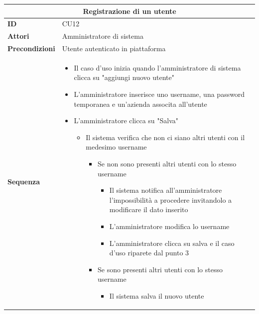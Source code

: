 \documentclass[a4paper,11pt]{article}
\begin{document}
\begin{table}[H]
  \centering
  \begin{tabular}{|m{2cm}|m{10.5cm}|}
    \hline
    \multicolumn{2}{|c|}{\textbf{Registrazione di un utente}}                                                                       \\ \hline
    \multicolumn{1}{|l|}{\textbf{ID}}              & CU12                                                                           \\ \hline
    \multicolumn{1}{|l|}{\textbf{Attori}}          & Amministratore di sistema                                                      \\ \hline
    \multicolumn{1}{|l|}{\textbf{Precondizioni}}   & Utente autenticato in piattaforma                                              \\ \hline
    \multicolumn{1}{|l|}{\textbf{Sequenza}}        &
    \begin{itemize}
      \item Il caso d'uso inizia quando l'amministratore di sistema clicca su "aggiungi nuovo utente"
      \item L'amministratore inserisce uno username, una password temporanea e un'azienda associta all'utente
      \item L'amministratore clicca su "Salva"
            \begin{itemize}
              \item Il sistema verifica che non ci siano altri utenti con il medesimo username
                    \begin{itemize}
                      \item Se non sono presenti altri utenti con lo stesso username
                            \begin{itemize}
                              \item Il sistema notifica all'amministratore l'impossibilità a procedere invitandolo a modificare il dato inserito
                              \item L'amministratore modifica lo username
                              \item L'amministratore clicca su salva e il caso d'uso riparete dal punto 3
                            \end{itemize}
                      \item Se sono presenti altri utenti con lo stesso username
                            \begin{itemize}
                              \item Il sistema salva il nuovo utente

\end{itemize}
\end{itemize}
\end{itemize}
\end{itemize}
\end{tabular}
\end{table}
\end{document}
